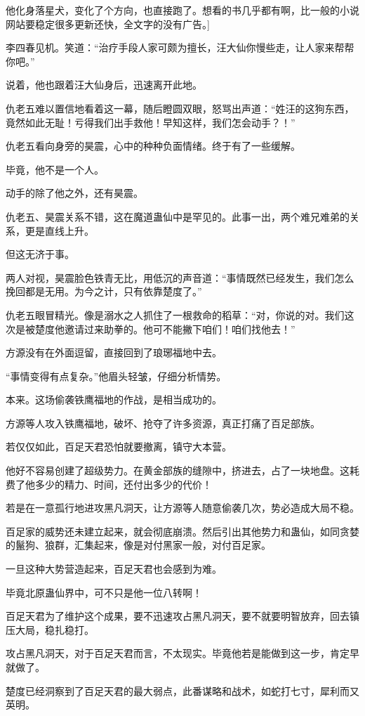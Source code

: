 \begin{this_body}
他化身落星犬，变化了个方向，也直接跑了。想看的书几乎都有啊，比一般的小说网站要稳定很多更新还快，全文字的没有广告。]

李四春见机。笑道：“治疗手段人家可颇为擅长，汪大仙你慢些走，让人家来帮帮你吧。”

说着，他也跟着汪大仙身后，迅速离开此地。

仇老五难以置信地看着这一幕，随后瞪圆双眼，怒骂出声道：“姓汪的这狗东西，竟然如此无耻！亏得我们出手救他！早知这样，我们怎会动手？！”

仇老五看向身旁的昊震，心中的种种负面情绪。终于有了一些缓解。

毕竟，他不是一个人。

动手的除了他之外，还有昊震。

仇老五、昊震关系不错，这在魔道蛊仙中是罕见的。此事一出，两个难兄难弟的关系，更是直线上升。

但这无济于事。

两人对视，昊震脸色铁青无比，用低沉的声音道：“事情既然已经发生，我们怎么挽回都是无用。为今之计，只有依靠楚度了。”

仇老五眼冒精光。像是溺水之人抓住了一根救命的稻草：“对，你说的对。我们这次是被楚度他邀请过来助拳的。他可不能撇下咱们！咱们找他去！”

方源没有在外面逗留，直接回到了琅琊福地中去。

“事情变得有点复杂。”他眉头轻皱，仔细分析情势。

本来。这场偷袭铁鹰福地的作战，是相当成功的。

方源等人攻入铁鹰福地，破坏、抢夺了许多资源，真正打痛了百足部族。

若仅仅如此，百足天君恐怕就要撤离，镇守大本营。

他好不容易创建了超级势力。在黄金部族的缝隙中，挤进去，占了一块地盘。这耗费了他多少的精力、时间，还付出多少的代价！

若是在一意孤行地进攻黑凡洞天，让方源等人随意偷袭几次，势必造成大局不稳。

百足家的威势还未建立起来，就会彻底崩溃。然后引出其他势力和蛊仙，如同贪婪的鬣狗、狼群，汇集起来，像是对付黑家一般，对付百足家。

一旦这种大势营造起来，百足天君也会感到为难。

毕竟北原蛊仙界中，可不只是他一位八转啊！

百足天君为了维护这个成果，要不迅速攻占黑凡洞天，要不就要明智放弃，回去镇压大局，稳扎稳打。

攻占黑凡洞天，对于百足天君而言，不太现实。毕竟他若是能做到这一步，肯定早就做了。

楚度已经洞察到了百足天君的最大弱点，此番谋略和战术，如蛇打七寸，犀利而又英明。


\end{this_body}
